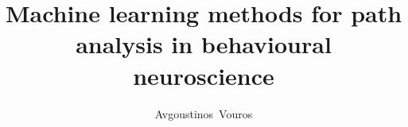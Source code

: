 \documentclass{beamer}
\title{Machine learning methods for path analysis in behavioural neuroscience}
\author{Avgoustinos~Vouros\inst{1}}
\institute[] %
{
  \inst{1}%
  PhD student, \\Department of Computer Science,\\
  University of Sheffield\\
  \vspace{5mm}
  \noindent Supervised by Prof Eleni Vasilaki
}
\date{} %
\newlength{\tmpShadow}
\newcommand{\MyShadow}[2]{%
	\settowidth{\tmpShadow}{#1}
	\addtolength{\tmpShadow}{.1em}
	\raisebox{-0.25ex}{\textcolor{gray!70}{#1}}%
	\kern-\tmpShadow%
	\textcolor{#2}{#1}%
}
\begin{document}
\begin{frame}
  \titlepage
\end{frame}



\end{document}
